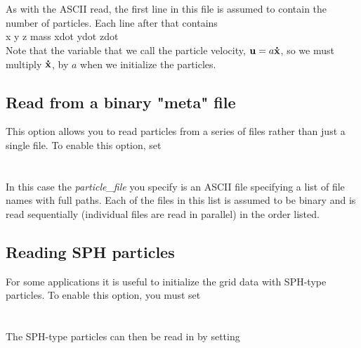  \\
 \\

As with the ASCII read, the first line in this file is
assumed to contain the number of particles.  Each line after that contains  \\

x y z mass xdot ydot zdot \\

Note that the variable that we call the particle velocity, ${\mathbf u} = a {\bf \dot{x}}$, 
so we must multiply ${\bf \dot{x}}$, by $a$ when we initialize the particles.

\subsection{Read from a binary "meta" file}

This option allows you to read particles from a series of files rather than 
just a single file.   To enable this option, set \\

 \\
 \\

In this case the {\em particle\_file} you specify is an ASCII file specifying a
list of file names with full paths.   Each of the files in this list is assumed
to be binary and is read sequentially (individual files are read in parallel) in 
the order listed.

\subsection{Reading SPH particles}

For some applications it is useful to initialize the grid data with SPH-type
particles.   To enable this option, you must set \\

 \\
 \\

\noindent The SPH-type particles can then be read in by setting \\

